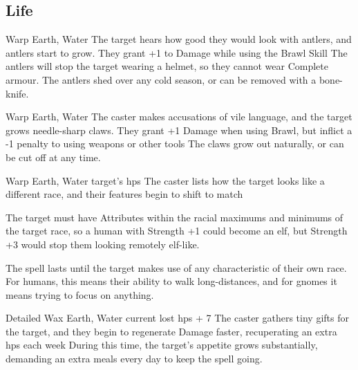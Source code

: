 \begin{multicols}{2}
{  



  \subsection{Life}


    {}%
    {Warp}%
    {Earth, Water}%
    {}%
    {The target hears how good they would look with antlers, and antlers start to grow.
    They grant +1 to Damage while using the Brawl Skill}%
    {
    The antlers will stop the target wearing a helmet, so they cannot wear Complete armour.
    The antlers shed over any cold season, or can be removed with a bone-knife.}

    {}%
    {Warp}%
    {Earth, Water}%
    {}%
    {The caster makes accusations of vile language, and the target grows needle-sharp claws.
    They grant +1 Damage when using Brawl, but inflict a -1 penalty to using weapons or other tools}%
    {
    The claws grow out naturally, or can be cut off at any time.}

    {}%
    {Warp}%
    {Earth, Water}%
    {target's \glspl{hp}}%
    {The caster lists how the target looks like a different race, and their features begin to shift to match}%
    {The target must have Attributes within the racial maximums and minimums of the target race, so a human with Strength +1 could become an elf, but Strength +3 would stop them looking remotely elf-like.

    The spell lasts until the target makes use of any characteristic of their own race.
    For humans, this means their ability to walk long-distances, and for gnomes it means trying to focus on anything.}

    {Detailed}%
    {Wax}%
    {Earth, Water}%
    {current lost \glspl{hp} + 7}%
    {The caster gathers tiny gifts for the target, and they begin to regenerate Damage faster, recuperating an extra  \glspl{hp} each week}%
    {During this time, the target's appetite grows substantially, demanding an extra  meals every day to keep the spell going.}

}
\end{multicols}
